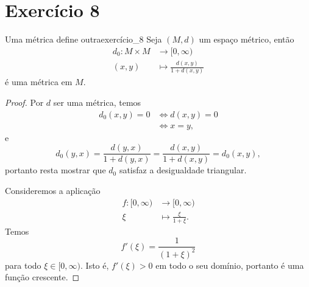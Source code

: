 \section*{Exercício 8}
\begin{proposition}{Uma métrica define outra}{exercício_8}
    Seja \((M, d)\) um espaço métrico, então
    \begin{align*}
        d_0 : M \times M &\to [0, \infty)\\
                   (x,y) &\mapsto \frac{d(x,y)}{1+d(x,y)}
    \end{align*}
    é uma métrica em \(M\).
\end{proposition}
\begin{proof}
    Por \(d\) ser uma métrica, temos
    \begin{align*}
        d_0(x,y) = 0 &\iff d(x,y) = 0\\
                     &\iff x = y,
    \end{align*}
    e
    \begin{equation*}
        d_0(y,x) = \frac{d(y,x)}{1 + d(y,x)} = \frac{d(x,y)}{1+d(x,y)} = d_0(x,y),
    \end{equation*}
    portanto resta mostrar que \(d_0\) satisfaz a desigualdade triangular.

    Consideremos a aplicação
    \begin{align*}
        f : [0, \infty) &\to [0, \infty)\\
                    \xi &\mapsto \frac{\xi}{1+\xi}.
    \end{align*}
    Temos
    \begin{equation*}
        f'(\xi) = \frac{1}{(1+\xi)^2}
    \end{equation*}
    para todo \(\xi \in [0,\infty)\). Isto é, \(f'(\xi) > 0\) em todo o seu domínio, portanto é uma função crescente.


\end{proof}
